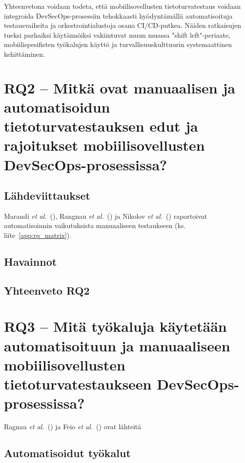 \documentclass[bscthesis,finnish,oneside,biblatex]{uefcsthesis}
\begin{document}
Yhteenvetona voidaan todeta, että mobiilisovellusten tietoturvatestaus voidaan integroida DevSecOps-prosessiin tehokkaasti hyödyntämällä automatisoituja testausvaiheita ja orkestrointialustoja osana CI/CD-putkea. Näiden ratkaisujen tueksi parhaiksi käytännöiksi vakiintuvat muun muassa "shift left"-periaate, mobiilispesifisten työkalujen käyttö ja turvallisuuskulttuurin systemaattinen kehittäminen.


\section{RQ2 – Mitkä ovat manuaalisen ja automatisoidun tietoturvatestauksen edut ja rajoitukset mobiilisovellusten DevSecOps-prosessissa?}
\label{sec:rq2}

\subsection{Lähdeviittaukset}
Marandi \emph{et al.}\ (\citeyear{marandi2023_ias}),
Rangnau \emph{et al.}\ (\citeyear{putra2022_devsecops}) ja
Nikolov \emph{et al.}\ (\citeyear{rangnau2020_cst}) raportoivat automatisoinnin
vaikutuksista manuaaliseen testaukseen (ks. liite~\ref{app:rq_matrix}).

\subsection{Havainnot}

\subsection{Yhteenveto RQ2}


\section{RQ3 – Mitä työkaluja käytetään automatisoituun ja manuaaliseen mobiilisovellusten tietoturvatestaukseen DevSecOps-prosessissa?}
\label{sec:rq3}

Ragnau \emph{et al.}\ (\citeyear{rangnau2020_cst}) ja
Feio \emph{et al.}\ (\citeyear{feio2024_empirical}) ovat lähteitä

\subsection{Automatisoidut työkalut}
\end{document}
